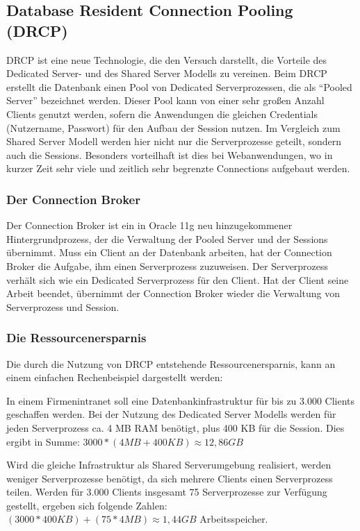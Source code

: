       \subsection{Database Resident Connection Pooling (DRCP)}
        DRCP ist eine neue Technologie, die den Versuch darstellt, die Vorteile des Dedicated Server- und des Shared Server Modells zu vereinen. Beim DRCP erstellt die Datenbank einen Pool von Dedicated Serverprozessen, die als \enquote{Pooled Server} bezeichnet werden. Dieser Pool kann von einer sehr gro\ss{}en Anzahl Clients genutzt werden, sofern die Anwendungen die gleichen Credentials (Nutzername, Passwort) f\"ur den Aufbau der Session nutzen. Im Vergleich zum Shared Server Modell werden hier nicht nur die Serverprozesse geteilt, sondern auch die Sessions. Besonders vorteilhaft ist dies bei Webanwendungen, wo in kurzer Zeit sehr viele und zeitlich sehr begrenzte Connections aufgebaut werden.


        \subsubsection{Der Connection Broker}
          Der Connection Broker ist ein in Oracle 11g neu hinzugekommener Hintergrundprozess, der die Verwaltung der Pooled Server und der Sessions \"ubernimmt. Muss ein Client an der Datenbank arbeiten, hat der Connection Broker die Aufgabe, ihm einen Serverprozess zuzuweisen. Der Serverprozess verh\"alt sich wie ein Dedicated Serverprozess f\"ur den Client. Hat der Client seine Arbeit beendet, \"ubernimmt der Connection Broker wieder die Verwaltung von Serverprozess und Session.
        \subsubsection{Die Ressourcenersparnis}
          Die durch die Nutzung von DRCP entstehende Ressourcenersparnis, kann an einem einfachen Rechenbeispiel dargestellt werden:

          In einem Firmenintranet soll eine Datenbankinfrastruktur f\"ur bis zu 3.000 Clients geschaffen werden. Bei der Nutzung des Dedicated Server Modells werden f\"ur jeden Serverprozess ca. 4 MB RAM ben\"otigt, plus 400 KB f\"ur die Session. Dies ergibt in Summe: $3000 * (4MB + 400KB) \approx 12,86 GB$

          Wird die gleiche Infrastruktur als Shared Serverumgebung realisiert, werden weniger Serverprozesse ben\"otigt, da sich mehrere Clients einen Serverprozess teilen. Werden f\"ur 3.000 Clients insgesamt 75 Serverprozesse zur Verf\"ugung gestellt, ergeben sich folgende Zahlen: $(3000 * 400 KB) + (75 * 4 MB) \approx 1,44 GB$ Arbeitsspeicher.

